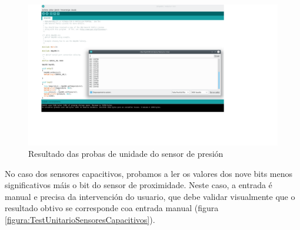   \begin{figure}[htbp]
   \centering
   \includegraphics[scale=0.4,angle=90,keepaspectratio=true]{./imagenes/resultado-test-sensor-presion.png}
   \caption{Resultado das probas de unidade do sensor de presión}
   \label{figura:ResultadoTestUnitarioSensorPresion}
  \end{figure}
  
  No caso dos sensores capacitivos, probamos a ler os valores dos nove bits
  menos significativos máis o bit do sensor de proximidade. Neste caso, a
  entrada é manual e precisa da intervención do usuario, que debe validar
  visualmente que o resultado obtivo se corresponde coa entrada manual
  (figura \ref{figura:TestUnitarioSensoresCapacitivos}).
   
